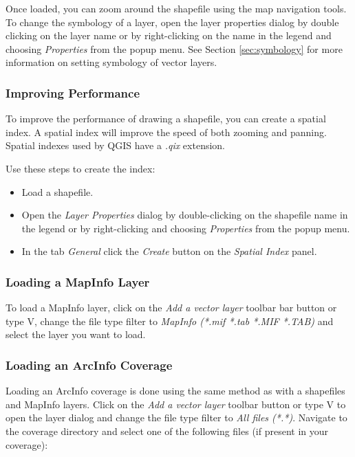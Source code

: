 Once loaded, you can zoom around the shapefile using the map navigation tools.
To change the symbology of a layer, open the layer properties dialog by double
clicking on the layer name or by right-clicking on the name in the legend and
choosing \textsl{Properties} from the popup menu. See
Section \ref{sec:symbology} for more information on setting symbology of
vector layers.
  
\subsubsection{Improving Performance}

To improve the performance of drawing a shapefile, you can create a spatial
index. A  spatial index will improve the 
speed of both zooming and panning. Spatial indexes used by QGIS have a 
\textsl{.qix} extension.

Use these steps to create the index:

\begin{itemize}
\item Load a shapefile.
\item Open the \textit{Layer Properties} dialog by double-clicking on the
shapefile name in the legend or by right-clicking and choosing
\textit{Properties} from the popup menu.
\item In the tab \textit{General} click the \textit{Create} button on the \textit{Spatial Index} panel.
\end{itemize}

\subsubsection{Loading a MapInfo Layer}

To load a MapInfo layer, click on the \textit{Add a vector layer}
toolbar bar button or type V, change the file type filter to \textit{MapInfo (*.mif
*.tab *.MIF *.TAB)} and select the layer you want to load.

\subsubsection{Loading an ArcInfo Coverage}

Loading an ArcInfo coverage is done using the same method as with a
shapefiles and MapInfo layers. Click on the \textit{Add a vector layer}
toolbar button or type V to open the layer dialog and change the file type filter to
\textit{All files (*.*)}. Navigate to the coverage directory and select one
of the following files (if present in your coverage):

